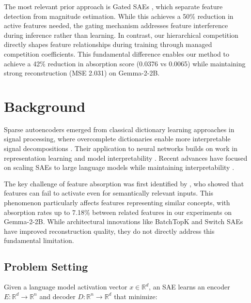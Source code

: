 \documentclass{article} %
\begin{document}
The most relevant prior approach is Gated SAEs \cite{rajamanoharanImprovingDictionaryLearning2024}, which separate feature detection from magnitude estimation. While this achieves a 50\% reduction in active features needed, the gating mechanism addresses feature interference during inference rather than learning. In contrast, our hierarchical competition directly shapes feature relationships during training through managed competition coefficients. This fundamental difference enables our method to achieve a 42\% reduction in absorption score (0.0376 vs 0.0065) while maintaining strong reconstruction (MSE 2.031) on Gemma-2-2B.

\section{Background}
\label{sec:background}

Sparse autoencoders emerged from classical dictionary learning approaches in signal processing, where overcomplete dictionaries enable more interpretable signal decompositions \cite{goodfellow2016deep}. Their application to neural networks builds on work in representation learning and model interpretability \cite{gaoScalingEvaluatingSparse}. Recent advances have focused on scaling SAEs to large language models while maintaining interpretability \cite{pauloAutomaticallyInterpretingMillions2024}.

The key challenge of feature absorption was first identified by \cite{chaninAbsorptionStudyingFeature2024}, who showed that features can fail to activate even for semantically relevant inputs. This phenomenon particularly affects features representing similar concepts, with absorption rates up to 7.18\% between related features in our experiments on Gemma-2-2B. While architectural innovations like BatchTopK \cite{bussmannBatchTopKSparseAutoencoders2024} and Switch SAEs \cite{mudideEfficientDictionaryLearning2024a} have improved reconstruction quality, they do not directly address this fundamental limitation.

\subsection{Problem Setting}
\label{subsec:problem}

Given a language model activation vector $x \in \mathbb{R}^d$, an SAE learns an encoder $E: \mathbb{R}^d \rightarrow \mathbb{R}^n$ and decoder $D: \mathbb{R}^n \rightarrow \mathbb{R}^d$ that minimize:
\end{document}
